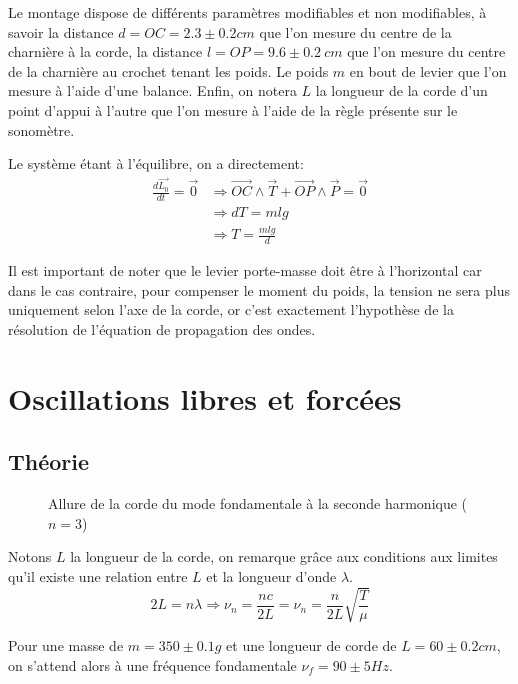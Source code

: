 \documentclass[11pt]{article}
\begin{document}
Le montage dispose de différents paramètres modifiables et non modifiables, à savoir la distance $d=OC=2.3 \pm 0.2 cm$ que l'on mesure du centre de la charnière à la corde, la distance $l=OP=9.6 \pm 0.2 \ cm$ que l'on mesure
du centre de la charnière au crochet tenant les poids. Le poids $m$ en bout de levier que l'on mesure à l'aide d'une balance. Enfin, on notera $L$ la longueur de la corde d'un point d'appui à l'autre que
l'on mesure à l'aide de la règle présente sur le sonomètre.

Le système étant à l'équilibre, on a directement:
\begin{align*}
    \frac{d \vec{L_0}}{dt} = \vec{0} & \Rightarrow \vec{OC} \wedge \vec{T} + \vec{OP} \wedge \vec{P} = \vec{0} \\
    & \Rightarrow dT = mlg \\
    & \Rightarrow T = \frac{mlg}{d}
\end{align*}

Il est important de noter que le levier porte-masse doit être à l'horizontal car dans le cas contraire, pour compenser le moment du poids, la tension ne sera plus
uniquement selon l'axe de la corde, or c'est exactement l'hypothèse de la résolution de l'équation de propagation des ondes. 

\break
\section{Oscillations libres et forcées}
\subsection{Théorie}
\begin{figure}[!h]
    \begin{center}
        \resizebox{0.8\textwidth}{3.2cm}{
            
        }
    \end{center}
    \caption{Allure de la corde du mode fondamentale à la seconde harmonique ($n=3$)}
    \label{fig:mode_fonda}
\end{figure}

Notons $L$ la longueur de la corde, on remarque grâce aux conditions aux limites qu'il existe une relation entre $L$ et la longueur d'onde $\lambda$.
\begin{equation}
    2L = n\lambda \Rightarrow \nu_n = \frac{nc}{2L} = \nu_n = \frac{n}{2L}\sqrt{\frac{T}{\mu}}
\end{equation}

Pour une masse de $m=350 \pm 0.1g$ et une longueur de corde de $L=60 \pm 0.2cm$, on s'attend alors à une fréquence fondamentale $\nu_f = 90 \pm 5 Hz$.
\end{document}
